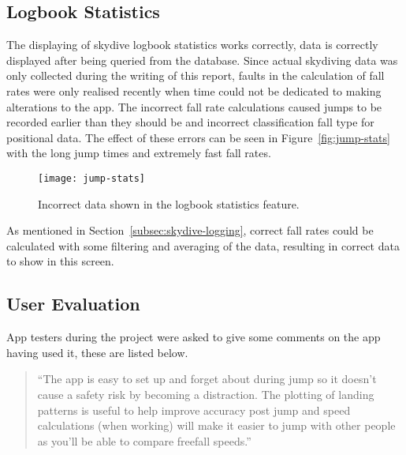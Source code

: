 \subsection{Logbook Statistics}
The displaying of skydive logbook statistics works correctly, data is correctly displayed after being queried from the database.
Since actual skydiving data was only collected during the writing of this report, faults in the calculation of fall rates were only realised recently when time could not be dedicated to making alterations to the app. The incorrect fall rate calculations caused jumps to be recorded earlier than they should be and incorrect classification fall type for positional data. The effect of these errors can be seen in Figure~\vref{fig:jump-stats} with the long jump times and extremely fast fall rates.

\begin{figure}[ht]
  \centering
  \texttt{[image: jump-stats]}
  \caption{Incorrect data shown in the logbook statistics feature.}\label{fig:jump-stats}
\end{figure}

As mentioned in Section~\ref{subsec:skydive-logging}, correct fall rates could be calculated with some filtering and averaging of the data, resulting in correct data to show in this screen.

\subsection{User Evaluation}
App testers during the project were asked to give some comments on the app having used it, these are listed below.

\begin{quote}
``The app is easy to set up and forget about during jump so it doesn't cause a safety risk by becoming a distraction. The plotting of landing patterns is useful to help improve accuracy post jump and speed calculations (when working) will make it easier to jump with other people as you'll be able to compare freefall speeds.''
\end{quote}
